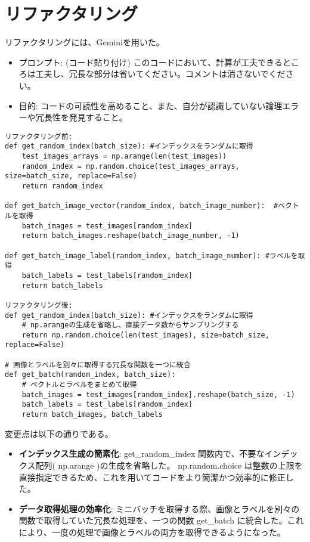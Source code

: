 \documentclass[11px,a4paper]{jsarticle}
\begin{document}
\section{リファクタリング}
リファクタリングには、Geminiを用いた。
\begin{itemize}
    \item プロンプト: (コード貼り付け) このコードにおいて、計算が工夫できるところは工夫し、冗長な部分は省いてください。コメントは消さないでください。
    \item 目的: コードの可読性を高めること、また、自分が認識していない論理エラーや冗長性を発見すること。
\end{itemize}
\begin{verbatim}
リファクタリング前:
def get_random_index(batch_size): #インデックスをランダムに取得
    test_images_arrays = np.arange(len(test_images))
    random_index = np.random.choice(test_images_arrays, size=batch_size, replace=False)
    return random_index

def get_batch_image_vector(random_index, batch_image_number):  #ベクトルを取得
    batch_images = test_images[random_index]
    return batch_images.reshape(batch_image_number, -1)

def get_batch_image_label(random_index, batch_image_number): #ラベルを取得
    batch_labels = test_labels[random_index]
    return batch_labels

リファクタリング後:
def get_random_index(batch_size): #インデックスをランダムに取得
    # np.arangeの生成を省略し、直接データ数からサンプリングする
    return np.random.choice(len(test_images), size=batch_size, replace=False)

# 画像とラベルを別々に取得する冗長な関数を一つに統合
def get_batch(random_index, batch_size): 
    # ベクトルとラベルをまとめて取得
    batch_images = test_images[random_index].reshape(batch_size, -1)
    batch_labels = test_labels[random_index]
    return batch_images, batch_labels
\end{verbatim}
変更点は以下の通りである。
\begin{itemize}
    \item \textbf{インデックス生成の簡素化}: get\_random\_index 関数内で、不要なインデックス配列( np.arange )の生成を省略した。 np.random.choice は整数の上限を直接指定できるため、これを用いてコードをより簡潔かつ効率的に修正した。
    \item \textbf{データ取得処理の効率化}: ミニバッチを取得する際、画像とラベルを別々の関数で取得していた冗長な処理を、一つの関数 get\_batch に統合した。これにより、一度の処理で画像とラベルの両方を取得できるようになった。
\end{itemize}
\end{document}
